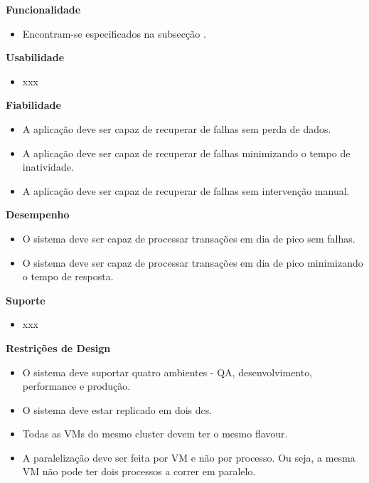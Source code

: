 \vspace{5mm}

\textbf{Funcionalidade}
\begin{itemize}
  \item Encontram-se especificados na subsecção .
\end{itemize}

\textbf{Usabilidade}
\begin{itemize}
  \item xxx
\end{itemize}

\textbf{Fiabilidade}
\begin{itemize}
  \item A aplicação deve ser capaz de recuperar de falhas sem perda de dados.
  \item A aplicação deve ser capaz de recuperar de falhas minimizando o tempo de inatividade.
  \item A aplicação deve ser capaz de recuperar de falhas sem intervenção manual.
\end{itemize}

\textbf{Desempenho}
\begin{itemize}
  \item O sistema deve ser capaz de processar transações em dia de pico sem falhas.
  \item O sistema deve ser capaz de processar transações em dia de pico minimizando o tempo de resposta.
\end{itemize}

\textbf{Suporte}
\begin{itemize}
  \item xxx
\end{itemize}

\textbf{Restrições de Design}
\begin{itemize}
  \item O sistema deve suportar quatro ambientes - \ac{QA}, desenvolvimento, 
    performance e produção.
  \item O sistema deve estar replicado em dois \glspl{dc}.
  \item Todas as \acp{VM} do mesmo \gls{cluster} devem ter o mesmo \gls{flavour}.
  \item A paralelização deve ser feita por \ac{VM} e não por processo. Ou seja, a mesma \ac{VM} 
    não pode ter dois processos a correr em paralelo.
\end{itemize}

